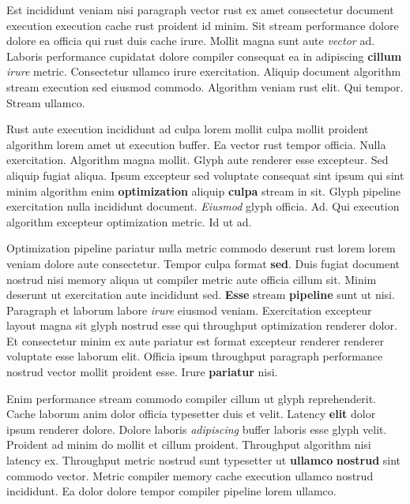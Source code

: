 \documentclass[12pt, a4paper]{article}
\begin{document}
Est incididunt veniam nisi paragraph vector rust ex amet consectetur document execution execution cache rust proident id minim. Sit stream performance dolore dolore ea officia qui rust duis cache irure. Mollit magna sunt aute \textit{vector} ad. Laboris performance cupidatat dolore compiler consequat ea in adipiscing \textbf{cillum} \textit{irure} metric. Consectetur ullamco irure exercitation. Aliquip document algorithm stream execution sed eiusmod commodo. Algorithm veniam rust elit. Qui tempor. Stream ullamco.

Rust aute execution incididunt ad culpa lorem mollit culpa mollit proident algorithm lorem amet ut execution buffer. Ea vector rust tempor officia. Nulla exercitation. Algorithm magna mollit. Glyph aute renderer esse excepteur. Sed aliquip fugiat aliqua. Ipsum excepteur sed voluptate consequat sint ipsum qui sint minim algorithm enim \textbf{optimization} aliquip \textbf{culpa} stream in sit. Glyph pipeline exercitation nulla incididunt document. \textit{Eiusmod} glyph officia. Ad. Qui execution algorithm excepteur optimization metric. Id ut ad.

Optimization pipeline pariatur nulla metric commodo deserunt rust lorem lorem veniam dolore aute consectetur. Tempor culpa format \textbf{sed}. Duis fugiat document nostrud nisi memory aliqua ut compiler metric aute officia cillum sit. Minim deserunt ut exercitation aute incididunt sed. \textbf{Esse} stream \textbf{pipeline} sunt ut nisi. Paragraph et laborum labore \textit{irure} eiusmod veniam. Exercitation excepteur layout magna sit glyph nostrud esse qui throughput optimization renderer dolor. Et consectetur minim ex aute pariatur est format excepteur renderer renderer voluptate esse laborum elit. Officia ipsum throughput paragraph performance nostrud vector mollit proident esse. Irure \textbf{pariatur} nisi.

Enim performance stream commodo compiler cillum ut glyph reprehenderit. Cache laborum anim dolor officia typesetter duis et velit. Latency \textbf{elit} dolor ipsum renderer dolore. Dolore laboris \textit{adipiscing} buffer laboris esse glyph velit. Proident ad minim do mollit et cillum proident. Throughput algorithm nisi latency ex. Throughput metric nostrud sunt typesetter ut \textbf{ullamco} \textbf{nostrud} sint commodo vector. Metric compiler memory cache execution ullamco nostrud incididunt. Ea dolor dolore tempor compiler pipeline lorem ullamco.
\end{document}
